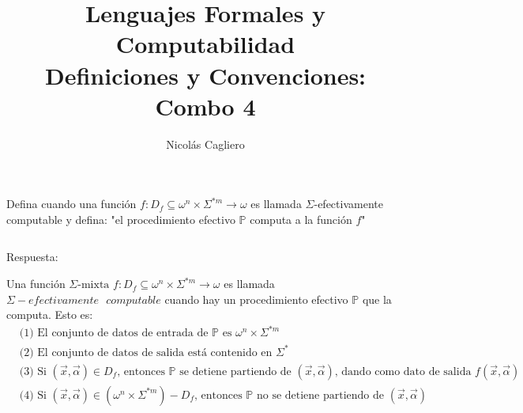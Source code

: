 \documentclass{article}
\title{Lenguajes Formales y Computabilidad \\
        \large Definiciones y Convenciones: Combo 4 }
\author{Nicolás Cagliero}
\begin{document}
\maketitle

Defina cuando una función $f : D_f \subseteq \omega^n \times \Sigma^{*m} 
\rightarrow \omega$
es llamada $\Sigma$-efectivamente computable y defina: "el procedimiento
efectivo $\mathbb{P}$ computa a la función $f$"

\(\)
\begin{center}
    Respuesta: 
    \(\)
\end{center}

Una función $\Sigma \text{-mixta } f : D_f \subseteq \omega^n \times \Sigma^{*m} 
\rightarrow \omega$ es llamada $\Sigma-efectivamente \text{ } computable$
cuando hay un procedimiento efectivo $\mathbb{P}$ que la computa. Esto es:
\begin{align*}
        &\text{(1) El conjunto de datos de entrada de } \mathbb{P}
        \text{ es } \omega^n \times \Sigma^{*m}\\
        &\text{(2) El conjunto de datos de salida está contenido en } \Sigma^{*}\\
        &\text{(3) Si } (\overset{\rightarrow}{x}, \overset{\rightarrow}{\alpha})
        \in D_f \text{, entonces } \mathbb{P} \text{ se detiene partiendo de }
        (\overset{\rightarrow}{x}, \overset{\rightarrow}{\alpha}) \text{,
         dando como dato de salida } f(\overset{\rightarrow}{x}, \overset{\rightarrow}{\alpha})\\
        &\text{(4) Si } (\overset{\rightarrow}{x}, \overset{\rightarrow}{\alpha})
        \in (\omega^n \times \Sigma^{*m}) - D_f \text{, entonces
         } \mathbb{P} \text{ no se detiene partiendo de } 
        (\overset{\rightarrow}{x}, \overset{\rightarrow}{\alpha})
\end{align*}
\end{document}
